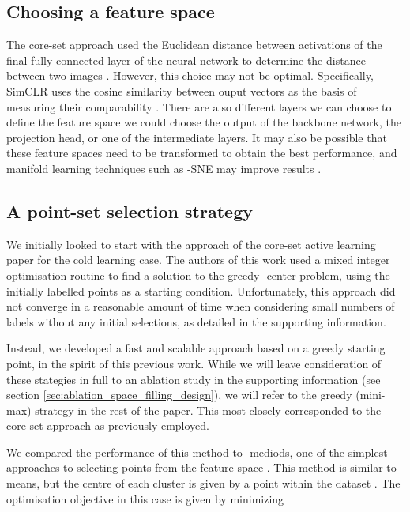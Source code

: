 \documentclass{article}
\begin{document}
\subsection{Choosing a feature space}

The core-set approach used the Euclidean distance between activations of the final fully connected layer of the neural network to determine the distance between two images \citep{sener2017active}. However, this choice may not be optimal. Specifically, SimCLR uses the cosine similarity between ouput vectors as the basis of measuring their comparability \citep{chen2020simple}. There are also different layers we can choose to define the feature space \textemdash{} we could choose the output of the backbone network, the projection head, or one of the intermediate layers. It may also be possible that these feature spaces need to be transformed to obtain the best performance, and manifold learning techniques such as -SNE may improve results \citep{van2008visualizing}.

\subsection{A point-set selection strategy}

We initially looked to start with the approach of the core-set active learning paper \citep{sener2017active} for the cold learning case. The authors of this work used a mixed integer optimisation routine to find a solution to the greedy -center problem, using the initially labelled points as a starting condition. Unfortunately, this approach did not converge in a reasonable amount of time when considering small numbers of labels without any initial selections, as detailed in the supporting information. 

Instead, we developed a fast and scalable approach based on a greedy starting point, in the spirit of this previous work. While we will leave consideration of these stategies in full to an ablation study in the supporting information (see section \ref{sec:ablation_space_filling_design}), we will refer to the greedy (mini-max) strategy in the rest of the paper. This most closely corresponded to the core-set approach as previously employed.

We compared the performance of this method to -mediods, one of the simplest approaches to selecting points from the feature space . This method is similar to -means, but the centre of each cluster is given by a point within the dataset \citep{park2009simple}. The optimisation objective in this case is given by minimizing
\end{document}
